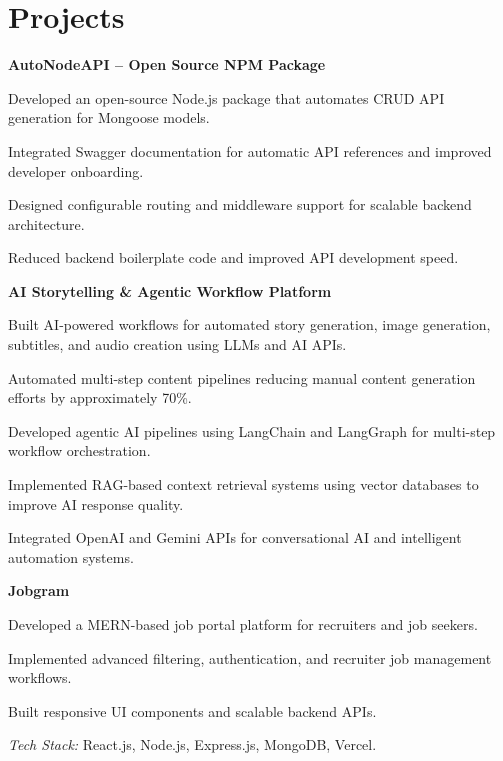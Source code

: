 \documentclass[10pt,a4paper]{moderncv}
\newcommand*{\projecttitle}[1]{\vspace{0.8mm}\textbf{#1}\\[-0.9mm]}
\begin{document}
\begin{minipage}[t]{0.66\textwidth}
\section{Projects}
\projecttitle{AutoNodeAPI -- Open Source NPM Package}
\begin{resitemize}
  \item Developed an open-source Node.js package that automates CRUD API generation for Mongoose models.
  \item Integrated Swagger documentation for automatic API references and improved developer onboarding.
  \item Designed configurable routing and middleware support for scalable backend architecture.
  \item Reduced backend boilerplate code and improved API development speed.
\end{resitemize}

\projecttitle{AI Storytelling \& Agentic Workflow Platform}
\begin{resitemize}
  \item Built AI-powered workflows for automated story generation, image generation, subtitles, and audio creation using LLMs and AI APIs.
  \item Automated multi-step content pipelines reducing manual content generation efforts by approximately 70\%.
  \item Developed agentic AI pipelines using LangChain and LangGraph for multi-step workflow orchestration.
  \item Implemented RAG-based context retrieval systems using vector databases to improve AI response quality.
  \item Integrated OpenAI and Gemini APIs for conversational AI and intelligent automation systems.
\end{resitemize}

\projecttitle{Jobgram}
\begin{resitemize}
  \item Developed a MERN-based job portal platform for recruiters and job seekers.
  \item Implemented advanced filtering, authentication, and recruiter job management workflows.
  \item Built responsive UI components and scalable backend APIs.
  \item \textit{Tech Stack:} React.js, Node.js, Express.js, MongoDB, Vercel.
\end{resitemize}

\end{minipage}
\end{document}
